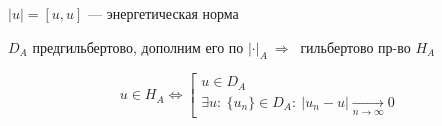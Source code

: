 $ |u| = [u, u] $ --- энергетическая норма

$ D_A $ предгильбертово, дополним его по $ {|\boldsymbol{\cdot}|}_A \ \Rightarrow \ $ гильбертово пр-во $ H_A $

\[ u \in H_A \Leftrightarrow \left[ \begin{array}{l}
	u \in D_A \\
	\exists u : \ \{ u_n \} \in D_A: \ | u_n - u | \underset{n \rightarrow \infty}{\rightarrow} 0
\end{array} \right. \]

\newpage